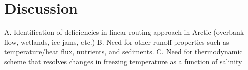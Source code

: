 \section{Discussion}

A.	Identification of deficiencies in linear routing approach in Arctic (overbank flow, wetlands, ice jams, etc.)
B.	Need for other runoff properties such as temperature/heat flux, nutrients, and sediments.
C.	Need for thermodynamic scheme that resolves changes in freezing temperature as a function of salinity
